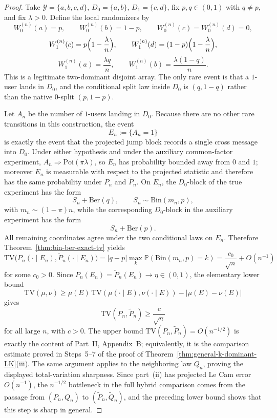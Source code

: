 \documentclass{article}
\newcommand{\TV}{\mathrm{TV}}
\newcommand{\Poi}{\mathrm{Poi}}
\newcommand{\Bin}{\mathrm{Bin}}
\newcommand{\Pbb}{\mathbb P}
\newcommand{\1}{\mathbf 1}
\newcommand{\weakto}{\Longrightarrow}
\begin{document}
\begin{proof}
Take $\mathcal Y=\{a,b,c,d\}$, $D_0=\{a,b\}$, $D_1=\{c,d\}$, fix $p,q\in(0,1)$ with $q\neq p$, and fix
$\lambda>0$. Define the local randomizers by
\[
W_0^{(n)}(a)=p,\qquad W_0^{(n)}(b)=1-p,
\qquad W_0^{(n)}(c)=W_0^{(n)}(d)=0,
\]
\[
W_1^{(n)}(c)=p\Bigl(1-\frac{\lambda}{n}\Bigr),
\qquad
W_1^{(n)}(d)=(1-p)\Bigl(1-\frac{\lambda}{n}\Bigr),
\]
\[
W_1^{(n)}(a)=\frac{\lambda q}{n},
\qquad
W_1^{(n)}(b)=\frac{\lambda(1-q)}{n}.
\]
This is a legitimate two-dominant disjoint array. The only rare event is that a $1$-user lands in $D_0$, and the
conditional split law inside $D_0$ is $(q,1-q)$ rather than the native $0$-split $(p,1-p)$.

Let $A_n$ be the number of $1$-users landing in $D_0$. Because there are no other rare transitions in this
construction, the event
\[
E_n:=\{A_n=1\}
\]
is exactly the event that the projected jump block records a single cross message into $D_0$. Under either
hypothesis and under the auxiliary common-factor experiment, $A_n\weakto \Poi(\pi\lambda)$, so $E_n$ has
probability bounded away from $0$ and $1$; moreover $E_n$ is measurable with respect to the projected statistic and
therefore has the same probability under $P_n$ and $\widetilde P_n$. On $E_n$, the $D_0$-block of the true
experiment has the form
\[
S_n+\mathrm{Ber}(q),
\qquad S_n\sim \Bin(m_n,p),
\]
with $m_n\sim (1-\pi)n$, while the corresponding $D_0$-block in the auxiliary experiment has the form
\[
S_n+\mathrm{Ber}(p).
\]
All remaining coordinates agree under the two conditional laws on $E_n$. Therefore Theorem~\ref{thm:bin-ber-exact-tv}
yields
\[
\TV\bigl(P_n(\cdot\mid E_n),\widetilde P_n(\cdot\mid E_n)\bigr)
=|q-p|\max_k \Pbb(\Bin(m_n,p)=k)
=\frac{c_0}{\sqrt n}+O(n^{-1})
\]
for some $c_0>0$. Since $P_n(E_n)=\widetilde P_n(E_n)\to \eta\in(0,1)$, the elementary lower bound
\[
\TV(\mu,\nu)\ge \mu(E)\,\TV(\mu(\cdot\mid E),\nu(\cdot\mid E))-
|\mu(E)-\nu(E)|
\]
gives
\[
\TV(P_n,\widetilde P_n)\ge \frac{c}{\sqrt n}
\]
for all large $n$, with $c>0$. The upper bound $\TV(P_n,\widetilde P_n)=O(n^{-1/2})$ is exactly the content of
Part~II, Appendix~B; equivalently, it is the comparison estimate proved in Steps~5--7 of the proof of
Theorem~\ref{thm:general-k-dominant-LK}(iii). The same argument applies to the neighboring
law $Q_n$, proving the displayed total-variation sharpness. Since part~(ii) has projected Le Cam error $O(n^{-1})$,
the $n^{-1/2}$ bottleneck in the full hybrid comparison comes from the passage from $(P_n,Q_n)$ to
$(\widetilde P_n,\widetilde Q_n)$, and the preceding lower bound shows that this step is sharp in general.
\end{proof}
\end{document}
